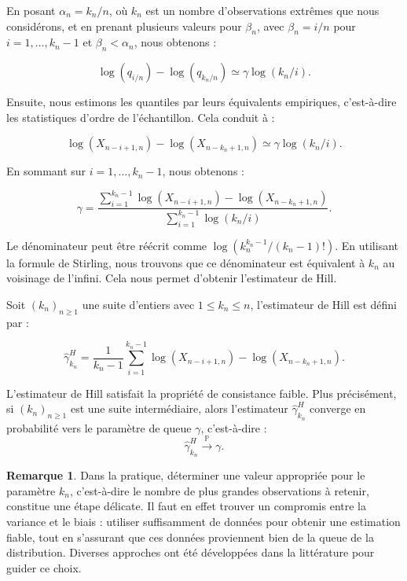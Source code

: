 \documentclass{article}
\theoremstyle{plain}
\theoremstyle{definition}
\newtheorem{remark}[definition]{Remarque}
\theoremstyle{plain}
\begin{document}
\noindent En posant $\alpha_n = k_n/n$, où \(k_n\) est un nombre d'observations extrêmes que nous considérons, et en prenant plusieurs valeurs pour \(\beta_n\), avec \(\beta_n = i/n\) pour \(i = 1, \ldots, k_n - 1\) et \(\beta_n < \alpha_n\), nous obtenons :

\[
\log(q_{i/n}) - \log(q_{k_n/n}) \simeq \gamma \log(k_n/i).
\]

\noindent Ensuite, nous estimons les quantiles par leurs équivalents empiriques, c'est-à-dire les statistiques d'ordre de l'échantillon. Cela conduit à :

\[
\log(X_{n - i + 1, n}) - \log(X_{n - k_n + 1, n}) \simeq \gamma \log(k_n / i).
\]

\noindent En sommant sur \(i = 1, \ldots, k_n - 1\), nous obtenons :

\[
\gamma = \frac{\sum_{i=1}^{k_n - 1} \log(X_{n - i + 1, n}) - \log(X_{n - k_n + 1, n})}{\sum_{i=1}^{k_n - 1} \log(k_n / i)}.
\]

\noindent Le dénominateur peut être réécrit comme \(\log(k_n^{k_n - 1}/(k_n - 1)!)\). En utilisant la formule de Stirling, nous trouvons que ce dénominateur est équivalent à \(k_n\) au voisinage de l'infini. Cela nous permet d'obtenir l'estimateur de Hill.

\noindent Soit $(k_n)_{n \geq 1}$ une suite d'entiers avec $1 \leq k_n \leq n$, l’estimateur de Hill est défini par :

\[
\hat{\gamma}^{H}_{k_n} = \frac{1}{k_n - 1} \sum_{i=1}^{k_n - 1} \log(X_{n - i + 1, n}) - \log(X_{n - k_n + 1, n}).
\]

\noindent L’estimateur de Hill satisfait la propriété de consistance faible. Plus précisément, si $(k_n)_{n \geq 1}$ est une suite intermédiaire, alors l’estimateur $\hat{\gamma}^{H}_{k_n}$ converge en probabilité vers le paramètre de queue $\gamma$, c’est-à-dire :
\[
\hat{\gamma}^{H}_{k_n} \xrightarrow{\mathbb{P}} \gamma.
\]

\begin{remark}
	Dans la pratique, déterminer une valeur appropriée pour le paramètre $k_n$, c’est-à-dire le nombre de plus grandes observations à retenir, constitue une étape délicate. Il faut en effet trouver un compromis entre la variance et le biais : utiliser suffisamment de données pour obtenir une estimation fiable, tout en s’assurant que ces données proviennent bien de la queue de la distribution. Diverses approches ont été développées dans la littérature pour guider ce choix.
\end{remark}
\end{document}
